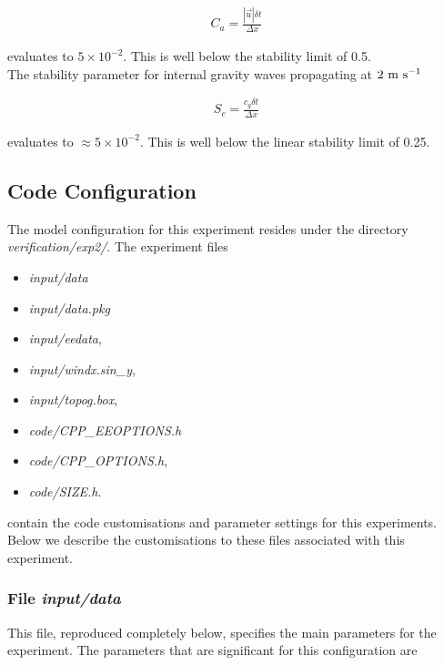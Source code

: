 \begin{eqnarray}
\label{EQ:eg-fourlayer-cfl_stability}
C_{a} = \frac{| \vec{u} | \delta t}{ \Delta x}
\end{eqnarray}

\noindent evaluates to $5 \times 10^{-2}$. This is well below the stability 
limit of 0.5.
\\

\noindent The stability parameter for internal gravity waves
propagating at $2~{\rm m}~{\rm s}^{-1}$ 

\begin{eqnarray}
\label{EQ:eg-fourlayer-igw_stability}
S_{c} = \frac{c_{g} \delta t}{ \Delta x}
\end{eqnarray}

\noindent evaluates to $\approx 5 \times 10^{-2}$. This is well below the linear
stability limit of 0.25.
  
\subsection{Code Configuration}
\label{www:tutorials}
\label{SEC:eg_fourl_code_config}

The model configuration for this experiment resides under the 
directory {\it verification/exp2/}.  The experiment files 
\begin{itemize}
\item {\it input/data}
\item {\it input/data.pkg}
\item {\it input/eedata},
\item {\it input/windx.sin\_y},
\item {\it input/topog.box},
\item {\it code/CPP\_EEOPTIONS.h}
\item {\it code/CPP\_OPTIONS.h},
\item {\it code/SIZE.h}. 
\end{itemize}
contain the code customisations and parameter settings for this 
experiments. Below we describe the customisations
to these files associated with this experiment.

\subsubsection{File {\it input/data}}
\label{www:tutorials}

This file, reproduced completely below, specifies the main parameters 
for the experiment. The parameters that are significant for this configuration
are

